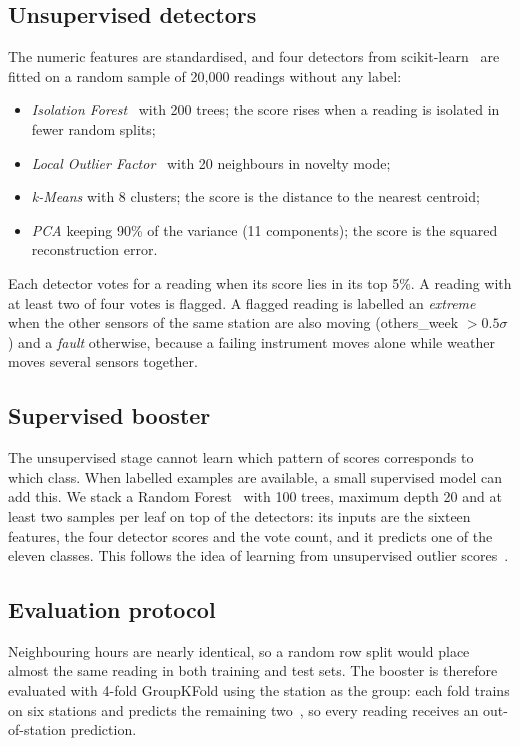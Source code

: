 \documentclass[conference]{IEEEtran}
\begin{document}
\subsection{Unsupervised detectors}
The numeric features are standardised, and four detectors from scikit-learn~\cite{pedregosa2011}
are fitted on a random sample of 20{,}000 readings without any label:
\begin{itemize}
\item \emph{Isolation Forest}~\cite{liu2008} with 200 trees; the score rises when a reading is isolated
in fewer random splits;
\item \emph{Local Outlier Factor}~\cite{breunig2000} with 20 neighbours in novelty mode;
\item \emph{k-Means} with 8 clusters; the score is the distance to the nearest centroid;
\item \emph{PCA} keeping 90\% of the variance (11 components); the score is the squared
reconstruction error.
\end{itemize}
Each detector votes for a reading when its score lies in its top 5\%. A reading with at least two
of four votes is flagged. A flagged reading is labelled an \emph{extreme} when the other sensors of
the same station are also moving (others\_week $> 0.5\sigma$) and a \emph{fault} otherwise, because a
failing instrument moves alone while weather moves several sensors together.

\subsection{Supervised booster}
The unsupervised stage cannot learn which pattern of scores corresponds to which class. When
labelled examples are available, a small supervised model can add this. We stack a Random
Forest~\cite{breiman2001} with 100 trees, maximum depth 20 and at least two samples per leaf on top
of the detectors: its inputs are the sixteen features, the four detector scores and the vote count,
and it predicts one of the eleven classes. This follows the idea of learning from unsupervised
outlier scores~\cite{micenkova2014}.

\subsection{Evaluation protocol}
Neighbouring hours are nearly identical, so a random row split would place almost the same reading
in both training and test sets. The booster is therefore evaluated with 4-fold GroupKFold using the
station as the group: each fold trains on six stations and predicts the remaining
two~\cite{roberts2017}, so every reading receives an out-of-station prediction.
\end{document}
